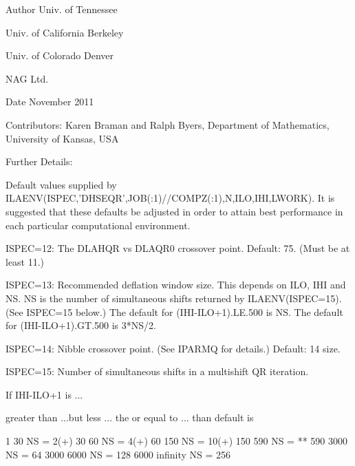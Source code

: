 \begin{DoxyAuthor}{Author}
Univ. of Tennessee 

Univ. of California Berkeley 

Univ. of Colorado Denver 

N\+A\+G Ltd. 
\end{DoxyAuthor}
\begin{DoxyDate}{Date}
November 2011 
\end{DoxyDate}
\begin{DoxyParagraph}{Contributors\+: }
Karen Braman and Ralph Byers, Department of Mathematics, University of Kansas, U\+S\+A 
\end{DoxyParagraph}
\begin{DoxyParagraph}{Further Details\+: }
\begin{DoxyVerb}             Default values supplied by
             ILAENV(ISPEC,'DHSEQR',JOB(:1)//COMPZ(:1),N,ILO,IHI,LWORK).
             It is suggested that these defaults be adjusted in order
             to attain best performance in each particular
             computational environment.

            ISPEC=12: The DLAHQR vs DLAQR0 crossover point.
                      Default: 75. (Must be at least 11.)

            ISPEC=13: Recommended deflation window size.
                      This depends on ILO, IHI and NS.  NS is the
                      number of simultaneous shifts returned
                      by ILAENV(ISPEC=15).  (See ISPEC=15 below.)
                      The default for (IHI-ILO+1).LE.500 is NS.
                      The default for (IHI-ILO+1).GT.500 is 3*NS/2.

            ISPEC=14: Nibble crossover point. (See IPARMQ for
                      details.)  Default: 14%
                      size.

            ISPEC=15: Number of simultaneous shifts in a multishift
                      QR iteration.

                      If IHI-ILO+1 is ...

                      greater than      ...but less    ... the
                      or equal to ...      than        default is

                           1               30          NS =   2(+)
                          30               60          NS =   4(+)
                          60              150          NS =  10(+)
                         150              590          NS =  **
                         590             3000          NS =  64
                        3000             6000          NS = 128
                        6000             infinity      NS = 256


\end{DoxyVerb}
\end{DoxyParagraph}

